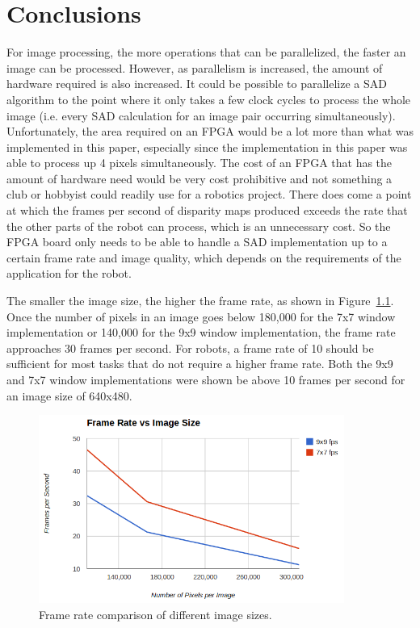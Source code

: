 \chapter{Conclusions}
\label{sec:concl}

For image processing, the more operations that can be parallelized, the faster an image can be processed. However, as parallelism is increased, the amount of hardware required is also increased. It could be possible to parallelize a SAD algorithm to the point where it only takes a few clock cycles to process the whole image (i.e. every SAD calculation for an image pair occurring simultaneously). Unfortunately, the area required on an FPGA would be a lot more than what was implemented in this paper, especially since the implementation in this paper was able to process up 4 pixels simultaneously. The cost of an FPGA that has the amount of hardware need would be very cost prohibitive and not something a club or hobbyist could readily use for a robotics project. There does come a point at which the frames per second of disparity maps produced exceeds the rate that the other parts of the robot can process, which is an unnecessary cost. So the FPGA board only needs to be able to handle a SAD implementation up to a certain frame rate and image quality, which depends on the requirements of the application for the robot.

The smaller the image size, the higher the frame rate, as shown in Figure~\ref{fig:frameRate}. Once the number of pixels in an image goes below 180,000 for the 7x7 window implementation or 140,000 for the 9x9 window implementation, the frame rate approaches 30 frames per second. For robots, a frame rate of 10 should be sufficient for most tasks that do not require a higher frame rate. Both the 9x9 and 7x7 window implementations were shown be above 10 frames per second for an image size of 640x480.

\begin{figure}
	\begin{center}
		\includegraphics[width=100mm]{figures/frameRate.png}
		\captionfonts
		\caption{Frame rate comparison of different image sizes.}
		\label{fig:frameRate}
	\end{center}
\end{figure}


